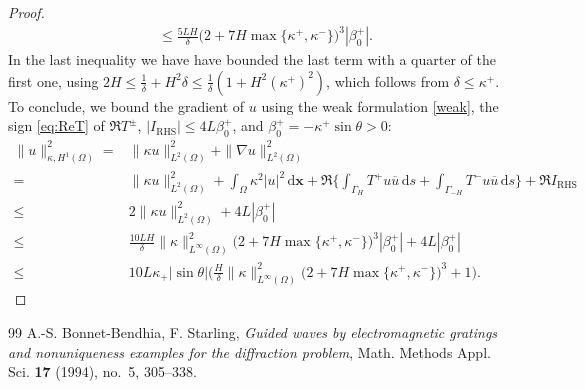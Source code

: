 \documentclass[10pt,a4paper]{amsart}
\newcommand{\bx}{{\mathbf x}}
\newcommand{\rd}{{\,\mathrm d}}
\newcommand{\cu}{{\overline{u}}}
\newcommand{\GH}{{\Gamma_H}}
\newcommand{\GmH}{{\Gamma_{-H}}}
\begin{document}
\begin{proof}
\begin{align*}
	&\le \frac{5LH}\delta\big(2+7H\max\{\kappa^+,\kappa^-\}\big)^3|\beta_0^+|.
\end{align*}
In the last inequality we have have bounded the last term with a quarter of the first one, using $2H\le\frac1\delta+H^2\delta\le\frac1\delta(1+H^2(\kappa^+)^2)$, which follows from $\delta\le\kappa^+$.
To conclude, we bound the gradient of $u$ using the weak formulation \eqref{weak}, the sign \eqref{eq:ReT} of $\Re T^\pm$, $|I_{\mathrm{RHS}}|\le 4L\beta_0^+$, and $\beta_0^+=-\kappa^+\sin\theta>0$:
\begin{align*} 
	\|u\|_{\kappa, H^1(\Omega)}^2 = 
	&\|\kappa u\|_{L^2(\Omega)}^2 + \|\nabla u\|_{L^2(\Omega)}^2
	\\ 
	=&\|\kappa u\|_{L^2(\Omega)}^2 +
	\int_\Omega \kappa^2 |u|^2\rd\bx+
	\Re\Big\{\int_\GH T^+u\cu\rd s+\int_\GmH T^-u\cu\rd s\Big\}+\Re I_{\mathrm{RHS}}
	\\ 
	\le& 2 \|\kappa u\|_{L^2(\Omega)}^2 +4L|\beta_0^+|
	\\ 
	\le& \frac{10LH}\delta\|\kappa\|_{L^\infty(\Omega)}^2 \big(2+7H\max\{\kappa^+,\kappa^-\}\big)^3|\beta_0^+|
	+4L|\beta_0^+|
	\\ 
	\le& 10L\kappa_+|\sin\theta|\bigg(\frac H\delta\|\kappa\|_{L^\infty(\Omega)}^2
	\big(2+7H\max\{\kappa^+,\kappa^-\}\big)^3+1\bigg).
\end{align*}
\end{proof}

\begin{thebibliography}{99}
 A.-S. Bonnet-Bendhia, F. Starling, \emph{Guided waves by electromagnetic gratings and nonuniqueness examples for the diffraction problem}, Math. Methods Appl. Sci. \textbf{17} (1994), no.~5, 305--338.
\end{thebibliography}
\end{document}
